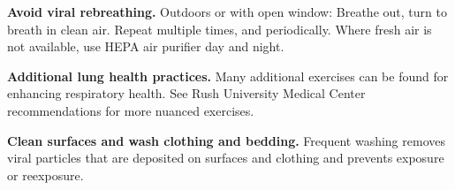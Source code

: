 \documentclass[onecolumn,journal]{IEEEtran}
\begin{document}
\begin{multicols}{2}

\textbf{Avoid viral rebreathing.} Outdoors or with open window: Breathe out, turn to breath in clean air. Repeat multiple times, and periodically. Where fresh air is not available, use HEPA air purifier day and night.

\textbf{Additional lung health practices.} Many additional exercises can be found for enhancing respiratory health. See Rush University Medical Center recommendations \cite{rush} for more nuanced exercises.

\textbf{Clean surfaces and wash clothing and bedding.} Frequent washing removes viral particles that are deposited on surfaces and clothing and prevents exposure or reexposure.

\end{multicols}
	


\end{document}
